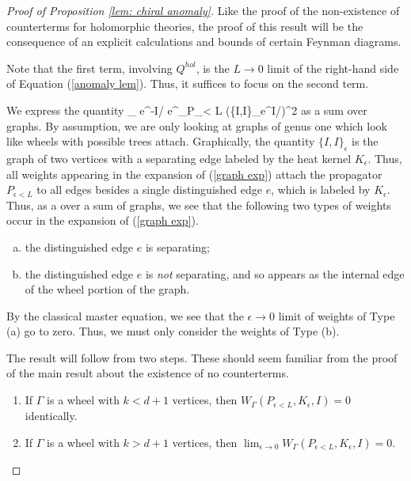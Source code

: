 \documentclass[10pt]{amsart}
\begin{document}
\begin{proof}[Proof of Proposition \ref{lem: chiral anomaly}]

Like the proof of the non-existence of counterterms for holomorphic theories, the proof of this result will be the consequence of an explicit calculations and bounds of certain Feynman diagrams. 

Note that the first term, involving $Q^{hol}$, is the $L \to 0$ limit of the right-hand side of Equation (\ref{anomaly lem}). 
Thus, it suffices to focus on the second term. 

We express the quantity
\be\label{graph exp}
\lim_{\epsilon {}} e^{-I/\hbar} e^{\hbar \partial_{P_{\epsilon < L}}} \left(\{I,I\}_\epsilon e^{I/\hbar}\right)\mod \hbar^2
\ee
as a sum over graphs.
By assumption, we are only looking at graphs of genus one which look like wheels with possible trees attach.
Graphically, the quantity $\{I,I\}_\epsilon$ is the graph of two vertices with a separating edge labeled by the heat kernel $K_\epsilon$.
Thus, all weights appearing in the expansion of (\ref{graph exp}) attach the propagator $P_{\epsilon<L}$ to all edges besides a single distinguished edge $e$, which is labeled by $K_\epsilon$. 
Thus, as a over a sum of graphs, we see that the following two types of weights occur in the expansion of (\ref{graph exp}).
\begin{enumerate}[(a)]
\item the distinguished edge $e$ is separating;
\item the distinguished edge $e$ is {\em not} separating, and so appears as the internal edge of the wheel portion of the graph.
\end{enumerate}

By the classical master equation, we see that the $\epsilon \to 0$ limit of weights of Type (a) go to zero.
Thus, we must only consider the weights of Type (b). 

The result will follow from two steps.
These should seem familiar from the proof of the main result about the existence of no counterterms.
\begin{enumerate}
\item If $\Gamma$ is a wheel with $k < d+1$ vertices, then $ W_\Gamma(P_{\epsilon < L}, K_\epsilon,I)
 = 0$ identically. 
\item If $\Gamma$ is a wheel with $k > d+1$ vertices, then $\lim_{\epsilon \to 0} W_\Gamma(P_{\epsilon < L}, K_\epsilon,I) =0$.
\end{enumerate} 


\end{proof}
\end{document}
